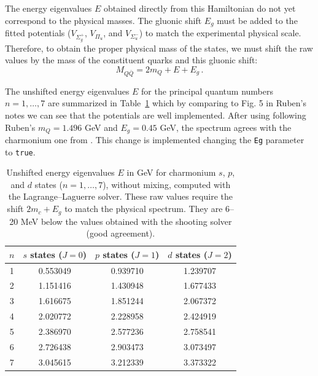 \documentclass[11pt, a4paper]{article}
\begin{document}
The energy eigenvalues $E$ obtained directly from this Hamiltonian do not yet correspond to the physical masses. The gluonic shift $E_g$ must be added to the fitted potentials ($V_{\Sigma_g^+}$, $V_{\Pi_u}$, and $V_{\Sigma_u^-}$) to match the experimental physical scale. Therefore, to obtain the proper physical mass of the states, we must shift the raw values by the mass of the constituent quarks and this gluonic shift:
\begin{equation}
    M_{Q\bar{Q}} = 2m_{Q} + E + E_g \, .
\end{equation}

The unshifted energy eigenvalues $E$ for the principal quantum numbers $n=1, \dots, 7$ are summarized in Table~\ref{tab:raw_E} which by comparing to Fig. 5 in Ruben's notes we can see that the potentials are well implemented.
After using following Ruben's $m_Q=1.496$ GeV and $E_g=0.45$ GeV, the spectrum agrees with the charmonium one from \cite{Oncala:2017hop}. This change is implemented changing the \texttt{Eg} parameter to \texttt{true}.

\begin{table}[hbt!]
    \centering
    \renewcommand{\arraystretch}{1.2}
    \begin{tabular}{c c c c}
        \hline
        \textbf{$n$} & \textbf{$s$ states ($J=0$)} & \textbf{$p$ states ($J=1$)} & \textbf{$d$ states ($J=2$)} \\
        \hline
        1 & 0.553049 & 0.939710 & 1.239707 \\
        2 & 1.151416 & 1.430948 & 1.677433 \\
        3 & 1.616675 & 1.851244 & 2.067372 \\
        4 & 2.020772 & 2.228958 & 2.424919 \\
        5 & 2.386970 & 2.577236 & 2.758541 \\
        6 & 2.726438 & 2.903473 & 3.073497 \\
        7 & 3.045615 & 3.212339 & 3.373322 \\
        \hline
    \end{tabular}
    \caption{\small Unshifted energy eigenvalues $E$ in GeV for charmonium $s$, $p$, and $d$ states ($n=1, \dots, 7$), without mixing, computed with the Lagrange--Laguerre solver. These raw values require the shift $2m_c + E_g$ to match the physical spectrum. They are 6--20 MeV below the values obtained with the shooting solver (good agreement).}
    \label{tab:raw_E}
\end{table}
\end{document}
